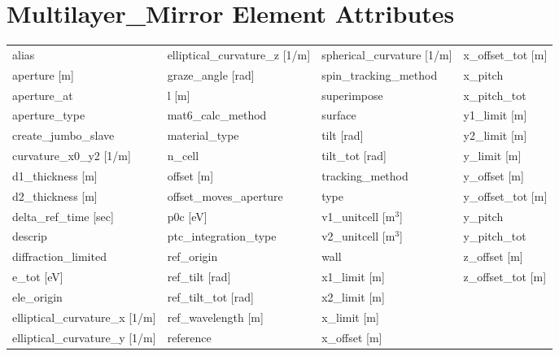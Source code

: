  \section{Multilayer_Mirror Element Attributes}
 \label{s:list.multilayer.mirror}
 
 \begin{tabular}{llll} \toprule
alias                          & elliptical_curvature_z [1/m]   & spherical_curvature [1/m]      & x_offset_tot [m]               \\
aperture [m]                   & graze_angle [rad]              & spin_tracking_method           & x_pitch                        \\
aperture_at                    & l [m]                          & superimpose                    & x_pitch_tot                    \\
aperture_type                  & mat6_calc_method               & surface                        & y1_limit [m]                   \\
create_jumbo_slave             & material_type                  & tilt [rad]                     & y2_limit [m]                   \\
curvature_x0_y2 [1/m]          & n_cell                         & tilt_tot [rad]                 & y_limit [m]                    \\
d1_thickness [m]               & offset [m]                     & tracking_method                & y_offset [m]                   \\
d2_thickness [m]               & offset_moves_aperture          & type                           & y_offset_tot [m]               \\
delta_ref_time [sec]           & p0c [eV]                       & v1_unitcell [m$^3$]            & y_pitch                        \\
descrip                        & ptc_integration_type           & v2_unitcell [m$^3$]            & y_pitch_tot                    \\
diffraction_limited            & ref_origin                     & wall                           & z_offset [m]                   \\
e_tot [eV]                     & ref_tilt [rad]                 & x1_limit [m]                   & z_offset_tot [m]               \\
ele_origin                     & ref_tilt_tot [rad]             & x2_limit [m]                   &                                \\
elliptical_curvature_x [1/m]   & ref_wavelength [m]             & x_limit [m]                    &                                \\
elliptical_curvature_y [1/m]   & reference                      & x_offset [m]                   &                                \\
 \bottomrule
 \end{tabular}
 \vfill
 
